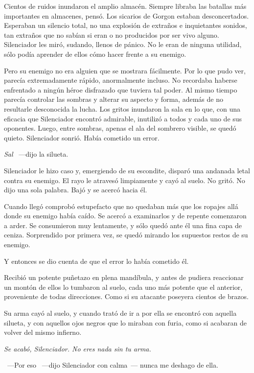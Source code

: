 Cientos de ruidos inundaron el amplio almacén. Siempre libraba las batallas más importantes en almacenes, pensó. Los sicarios de Gorgon estaban desconcertados. Esperaban un silencio total, no una explosión de extraños e inquietantes sonidos, tan extraños que no sabían si eran o no producidos por ser vivo alguno. Silenciador les miró, sudando, llenos de pánico. No le eran de ninguna utilidad, sólo podía aprender de ellos cómo hacer frente a su enemigo.

Pero su enemigo no era alguien que se mostrara fácilmente. Por lo que pudo ver, parecía extremadamente rápido, anormalmente incluso. No recordaba haberse enfrentado a ningún héroe disfrazado que tuviera tal poder. Al mismo tiempo parecía controlar las sombras y alterar su aspecto y forma, además de no resultarle desconocida la lucha. Los gritos inundaron la sala en lo que, con una eficacia que Silenciador encontró admirable, inutilizó a todos y cada uno de sus oponentes. Luego, entre sombras, apenas el ala del sombrero visible, se quedó quieto. Silenciador sonrió. Había cometido un error.

\emph{Sal} ~---dijo la silueta.

Silenciador le hizo caso y, emergiendo de su escondite, disparó una andanada letal contra su enemigo. El rayo le atravesó limpiamente y cayó al suelo. No gritó. No dijo una sola palabra. Bajó y se acercó hacia él.

Cuando llegó comprobó estupefacto que no quedaban más que los ropajes allá donde su enemigo había caído. Se acercó a examinarlos y de repente comenzaron a arder. Se consumieron muy lentamente, y sólo quedó ante él una fina capa de ceniza. Sorprendido por primera vez, se quedó mirando los supuestos restos de su enemigo.

Y entonces se dio cuenta de que el error lo había cometido él.

Recibió un potente puñetazo en plena mandíbula, y antes de pudiera reaccionar un montón de ellos lo tumbaron al suelo, cada uno más potente que el anterior, proveniente de todas direcciones. Como si su atacante poseyera cientos de brazos.

Su arma cayó al suelo, y cuando trató de ir a por ella se encontró con aquella silueta, y con aquellos ojos negros que lo miraban con furia, como si acabaran de volver del mismo infierno.

\emph{Se acabó, Silenciador. No eres nada sin tu arma.}

~---Por eso ~---dijo Silenciador con calma~--- nunca me deshago de ella.

